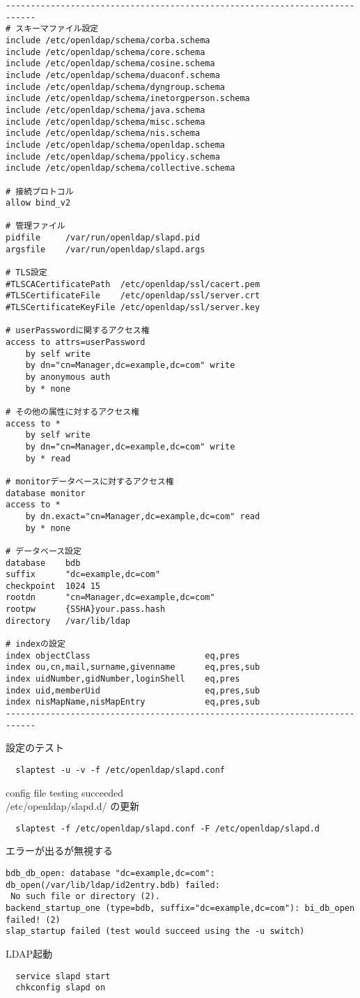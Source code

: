 \begin{verbatim}
----------------------------------------------------------------------------
# スキーマファイル設定
include /etc/openldap/schema/corba.schema
include /etc/openldap/schema/core.schema
include /etc/openldap/schema/cosine.schema
include /etc/openldap/schema/duaconf.schema
include /etc/openldap/schema/dyngroup.schema
include /etc/openldap/schema/inetorgperson.schema
include /etc/openldap/schema/java.schema
include /etc/openldap/schema/misc.schema
include /etc/openldap/schema/nis.schema
include /etc/openldap/schema/openldap.schema
include /etc/openldap/schema/ppolicy.schema
include /etc/openldap/schema/collective.schema

# 接続プロトコル
allow bind_v2

# 管理ファイル
pidfile     /var/run/openldap/slapd.pid
argsfile    /var/run/openldap/slapd.args

# TLS設定
#TLSCACertificatePath  /etc/openldap/ssl/cacert.pem
#TLSCertificateFile    /etc/openldap/ssl/server.crt
#TLSCertificateKeyFile /etc/openldap/ssl/server.key

# userPasswordに関するアクセス権
access to attrs=userPassword
    by self write
    by dn="cn=Manager,dc=example,dc=com" write
    by anonymous auth
    by * none

# その他の属性に対するアクセス権
access to *
    by self write
    by dn="cn=Manager,dc=example,dc=com" write
    by * read

# monitorデータベースに対するアクセス権
database monitor
access to *
    by dn.exact="cn=Manager,dc=example,dc=com" read
    by * none

# データベース設定
database    bdb
suffix      "dc=example,dc=com"
checkpoint  1024 15
rootdn      "cn=Manager,dc=example,dc=com"
rootpw      {SSHA}your.pass.hash
directory   /var/lib/ldap

# indexの設定
index objectClass                       eq,pres
index ou,cn,mail,surname,givenname      eq,pres,sub
index uidNumber,gidNumber,loginShell    eq,pres
index uid,memberUid                     eq,pres,sub
index nisMapName,nisMapEntry            eq,pres,sub
----------------------------------------------------------------------------
\end{verbatim}
設定のテスト
\begin{verbatim}
  slaptest -u -v -f /etc/openldap/slapd.conf
\end{verbatim}
config file testing succeeded\\
/etc/openldap/slapd.d/ の更新
\begin{verbatim}
  slaptest -f /etc/openldap/slapd.conf -F /etc/openldap/slapd.d
\end{verbatim}
エラーが出るが無視する
\begin{verbatim}
bdb_db_open: database "dc=example,dc=com": db_open(/var/lib/ldap/id2entry.bdb) failed:
 No such file or directory (2).
backend_startup_one (type=bdb, suffix="dc=example,dc=com"): bi_db_open failed! (2)
slap_startup failed (test would succeed using the -u switch)
\end{verbatim}
LDAP起動
\begin{verbatim}
  service slapd start
  chkconfig slapd on
\end{verbatim}

